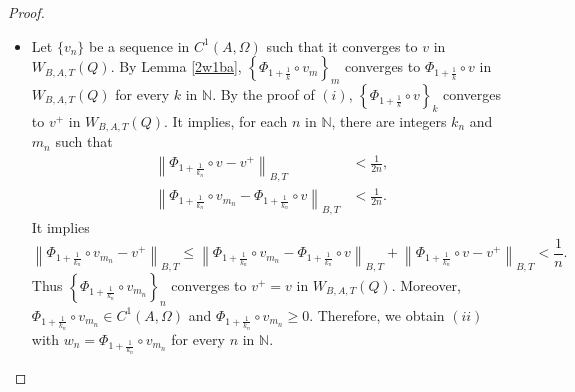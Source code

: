 \documentclass[11pt, a4paper]{article}
\numberwithin{equation}{section}
\newcommand{\NN}{{\mathbb N}}
\newcommand{\norm}[1]{\left\lVert #1\right\rVert}
\begin{document}
\begin{proof}
\begin{itemize}[wide]
\item[$(ii)$] Let $\{v_{n}\}$ be a sequence in $C^{1}(A,\Omega)$ such
  that it converges to  $v$ in $W_{B,A,T}(Q)$. By Lemma \ref{2w1ba},
  $\left\{\Phi_{1+\frac{1}{k}}\circ v_{m}\right\}_{m}$ converges to
  $\Phi_{1+\frac{1}{k}}\circ v$ in  $W_{B,A,T}(Q)$ for every $k$ in
  $\NN$. By the proof of $(i)$, $\left\{\Phi_{1+\frac{1}{k}}\circ v \right\}_{k}$
  converges to $v^{+}$ in  $W_{B,A,T}(Q)$. It implies, for each  $n$
  in $\NN$, there are integers  $k_{n}$ and $m_{n}$ such that
  \begin{align*}
    \norm{\Phi_{1+\frac{1}{k_{n}}}\circ v- v^{+}}_{B,T}
    &<\frac{1}{2n},\\
    \norm{\Phi_{1+\frac{1}{k_{n}}}\circ
    v_{m_{n}}-\Phi_{1+\frac{1}{k_{n}}}\circ v}_{B,T}
    &<\frac{1}{2n}.
  \end{align*}
  It implies
  \[
    \norm{\Phi_{1+\frac{1}{k_{n}}}\circ v_{m_{n}}- v^{+}}_{B,T} \le
    \norm{\Phi_{1+\frac{1}{k_{n}}}\circ
      v_{m_{n}}-\Phi_{1+\frac{1}{k_{n}}}\circ
      v}_{B,T}+\norm{\Phi_{1+\frac{1}{k_{n}}}\circ v-
      v^{+}}_{B,T}<\frac{1}{n}. \] Thus
  $\left\{\Phi_{1+\frac{1}{k_{n}}}\circ v_{m_{n}}\right\}_n$ converges
  to $v^{+}=v$ in $W_{B,A,T}(Q)$. Moreover,
  $\Phi_{1+\frac{1}{k_{n}}}\circ v_{m_{n}} \in C^1(A,\Omega)$ and
  $\Phi_{1+\frac{1}{k_{n}}}\circ v_{m_{n}}\ge 0$. Therefore, we obtain
  $(ii)$ with $w_{n}=\Phi_{1+\frac{1}{k_{n}}}\circ v_{m_{n}}$ for
  every $n$ in $\NN$.
  

\end{itemize}
\end{proof}
\end{document}
